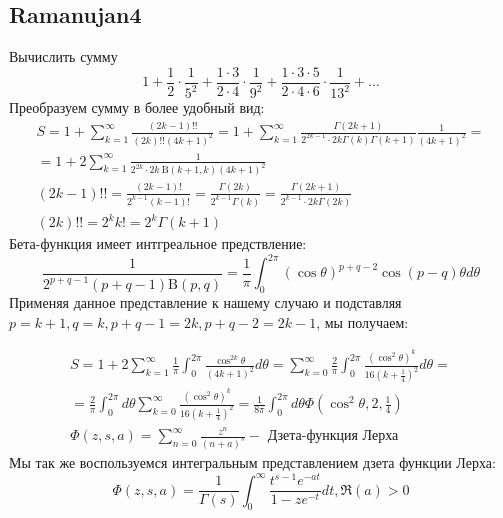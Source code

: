 	\subsection{Ramanujan4}
	
	Вычислить сумму
	$$
	1+\frac{1}{2} \cdot \frac{1}{5^2}+\frac{1 \cdot 3}{2 \cdot 4} \cdot \frac{1}{9^2}+\frac{1 \cdot 3 \cdot 5}{2 \cdot 4 \cdot 6} \cdot \frac{1}{13^2}+\ldots
	$$
	Преобразуем сумму в более удобный вид:
	$$
	\begin{gathered}
		S=1+\sum_{k=1}^{\infty} \frac{(2 k-1) ! !}{(2 k) ! !(4 k+1)^2}=1+\sum_{k=1}^{\infty} \frac{\Gamma(2 k+1)}{2^{2 k-1} \cdot 2 k \Gamma(k) \Gamma(k+1)} \frac{1}{(4 k+1)^2}= \\
		=1+2 \sum_{k=1}^{\infty} \frac{1}{2^{2 k} \cdot 2 k \mathrm{~B}(k+1, k)(4 k+1)^2} \\
		(2 k-1) ! !=\frac{(2 k-1) !}{2^{k-1}(k-1) !}=\frac{\Gamma(2 k)}{2^{k-1} \Gamma(k)}=\frac{\Gamma(2 k+1)}{2^{k-1} \cdot 2 k \Gamma(2 k)} \\
		(2 k) ! !=2^k k !=2^k \Gamma(k+1)
	\end{gathered}
	$$
	Бета-функция имеет интгреальное предствление:
	$$
	\frac{1}{2^{p+q-1}(p+q-1) \mathrm{B}(p, q)}=\frac{1}{\pi} \int_0^{2 \pi}(\cos \theta)^{p+q-2} \cos (p-q) \theta d \theta
	$$
	Применяя данное представление к нашему случаю и подставляя $p=k+1, q=k, p+q-1=2 k, p+q-2=2 k-1$, мы получаем:
	
	$$
	\begin{array}{r}
		S=1+2 \sum_{k=1}^{\infty} \frac{1}{\pi} \int_0^{2 \pi} \frac{\cos ^{2 k} \theta}{(4 k+1)^2} d \theta=\sum_{k=0}^{\infty} \frac{2}{\pi} \int_0^{2 \pi} \frac{\left(\cos ^2 \theta\right)^k}{16\left(k+\frac{1}{4}\right)^2} d \theta= \\
		=\frac{2}{\pi} \int_0^{2 \pi} d \theta \sum_{k=0}^{\infty} \frac{\left(\cos ^2 \theta\right)^k}{16\left(k+\frac{1}{4}\right)^2}=\frac{1}{8 \pi} \int_0^{2 \pi} d \theta \Phi\left(\cos ^2 \theta, 2, \frac{1}{4}\right) \\
		\Phi(z, s, a)=\sum_{n=0}^{\infty} \frac{z^n}{(n+a)^s}-\text { Дзета-функция Лерха }
	\end{array}
	$$
	Мы так же воспользуемся интегральным представлением дзета функции Лерха:
	$$
	\Phi(z, s, a)=\frac{1}{\Gamma(s)} \int_0^{\infty} \frac{t^{s-1} e^{-a t}}{1-z e^{-t}} d t, \Re(a)>0
	$$
	
